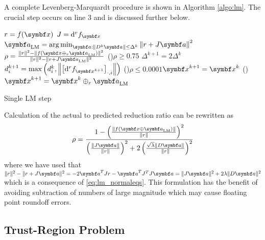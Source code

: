 A complete Levenberg-Marquardt procedure is shown in Algorithm \ref{algo:lm}. The crucial step occurs on line 3 and is discussed further below.
\begin{algorithm}
  \DontPrintSemicolon

  $r = f(\x)$\;
  $J = \mathrm{d}^r f_\x$\;
  $\a_\mathrm{LM} = \argmin_{\a : \| D^{k} \a \| \leq \Delta^{k} }\left\| r + J \a \right \|^2$ 
  $\rho = \frac{ \| r \|^2 - \| f(\x \oplus_r \a_\mathrm{LM}) \|^2 }{\| r \|^2 - \| r + J \a_\mathrm{LM} \|^2}$ 
  \ElseIf(){$\rho \geq 0.75$}{
    $\Delta^{k+1} = 2 \Delta^{k}$ 
  }
  $d_i^{k+1} = \max \left(d_i^k, \left\| \left[ \mathrm{d}^r f_{\x^{k+1}} \right]_{\cdot, i} \right\| \right)$ 
  \lIf(){$\rho \leq 0.0001$}{$\x^{k+1} = \x^k$}
  \lElse(){ $\x^{k+1} = \x^k \oplus_r \a_\mathrm{LM}$}

  \caption{Single LM step}
  \label{algo:lm}
\end{algorithm}

Calculation of the actual to predicted reduction ratio can be rewritten as
\begin{equation}
  \rho = \frac{1 - \left( \frac{ \| f(\x \oplus \a_\mathrm{LM}) \|}{\|r\|} \right)^2 }{\left( \frac{\| J \a \|}{\| r \|} \right)^2 + 2 \left( \frac{\sqrt{\lambda} \| D \a \|}{\| r \|} \right)^2}
\end{equation}
where we have used that $\| r \|^2 - \| r + J \a \|^2 = -2 \a^T J r - \a^T J^T J \a = \| J \a \|^2 + 2 \lambda \| D \a \|^2$ which is a consequence of \eqref{eq:lm_normaleqs}. This formulation has the benefit of avoiding subtraction of numbers of large magnitude which may cause floating point roundoff errors.


\subsection{Trust-Region Problem}

